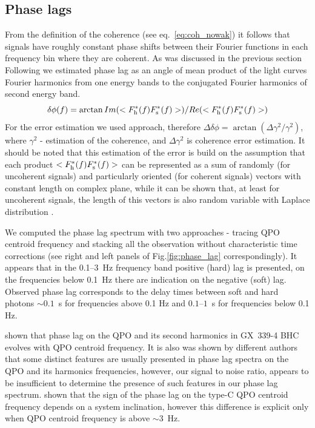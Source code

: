 \documentclass[a4paper,fleqn,usenatbib]{mnras}
\begin{document}
\subsection{Phase lags}
        From the definition of the coherence (see eq.~\ref{eq:coh_nowak}) it follows that signals have roughly constant phase shifts between their Fourier functions in each frequency bin where they are coherent. 
As was discussed in the previous section Following \citep{1997ApJ...474L..43V} we estimated phase lag as an angle of mean product of the light curves Fourier harmonics from one energy bands to the conjugated Fourier harmonics of second energy band. 
\begin{equation}
        \delta \phi(f) = \arctan{Im(<F_{\rm h}^{*}(f) F_{\rm s}^{*}(f)>)/Re(<F_{\rm h}^{*}(f) F_{\rm s}^{*}(f)>)}
\end{equation}
For the error estimation we used \citep{2014A&ARv..22...72U} approach, therefore $\Delta\delta\phi = \arctan{(\Delta\gamma^2/\gamma^2)}$, where $\gamma^2$ - estimation of the coherence, and $\Delta\gamma^2$ is coherence error estimation.
It should be noted that this estimation of the error is build on the assumption that each product $<F_{\rm h}^{*}(f) F_{\rm s}^{*}(f)>$ can be represented as a sum of randomly (for uncoherent signals) and particularly oriented (for coherent signals) vectors with constant length on complex plane, while it can be shown that, at least for uncoherent signals, the length of this vectors is also random variable with Laplace distribution \citep{2017arXiv170909666H}.

We computed the phase lag spectrum with two approaches - tracing QPO centroid frequency and stacking all the observation without characteristic time corrections (see right and left panels of Fig.\ref{fig:phase_lag} correspondingly).
It appears that in the 0.1--3~Hz frequency band positive (hard) lag is presented, on the frequencies below 0.1~Hz there are indication on the negative (soft) lag.
Observed phase lag corresponds to the delay times between soft and hard photons $\sim0.1$~s for frequencies above 0.1 Hz and $0.1$--$1$~s for frequencies below 0.1 Hz.

\citet{2017ApJ...845..143Z} shown that phase lag on the QPO and its second harmonics in GX~339-4 BHC evolves with QPO centroid frequency. 
It is also was shown by different authors \citep[see, e.g.,][]{2013ApJ...778..136P, 2017ApJ...845..143Z} that some distinct features are usually presented in phase lag spectra on the QPO and its harmonics frequencies, however, our signal to noise ratio, appears to be insufficient to determine the presence of such features in our phase lag spectrum.
\citep{2017MNRAS.464.2643V} shown that the sign of the phase lag on the type-C QPO centroid frequency depends on a system inclination, however this difference is explicit only when QPO centroid frequency is above $\sim3$~Hz.
\end{document}
